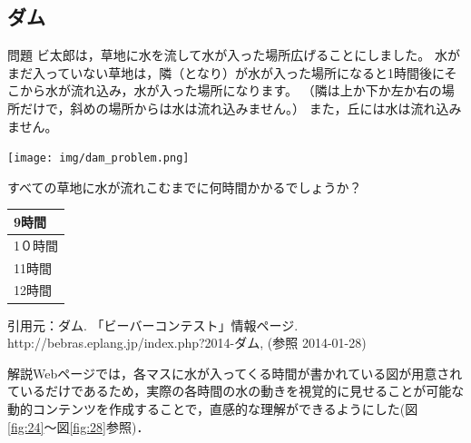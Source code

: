 \documentclass[a4paper]{jarticle}
\begin{document}
\begin{multicols}{2}
\subsection{ダム}
\begin{itembox}[l]{問題}
ビ太郎は，草地に水を流して水が入った場所広げることにしました。
水がまだ入っていない草地は，隣（となり）が水が入った場所になると1時間後にそこから水が流れ込み，水が入った場所になります。
（隣は上か下か左か右の場所だけで，斜めの場所からは水は流れ込みません。）
また，丘には水は流れ込みません。
\begin{center}
\texttt{[image: img/dam\_problem.png]}
\end{center}
すべての草地に水が流れこむまでに何時間かかるでしょうか？
\begin{center}
\begin{tabular}{|p{2cm}|} \hline
9時間\\ \hline
1０時間\\ \hline
11時間\\ \hline
12時間\\ \hline
\end{tabular}
\end{center}
{ \scriptsize 引用元：ダム. 「ビーバーコンテスト」情報ページ. http://bebras.eplang.jp/index.php?2014-ダム, (参照 2014-01-28)}
\end{itembox}

解説Webページでは，各マスに水が入ってくる時間が書かれている図が用意されているだけであるため，実際の各時間の水の動きを視覚的に見せることが可能な動的コンテンツを作成することで，直感的な理解ができるようにした(図\ref{fig:24}〜図\ref{fig:28}参照)．
\\
\\
\\
\\
\\
\\
\\
\\
\\
\\
\\
\\
\\


\end{multicols}
\end{document}
